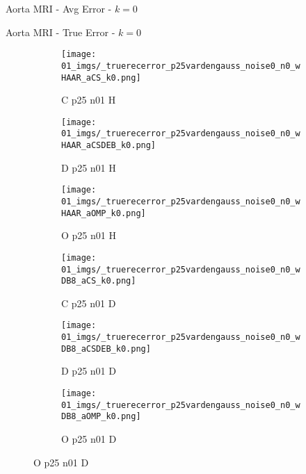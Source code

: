 \begin{frame}{Aorta MRI - Avg Error - $k=0$}{}
\begin{figure}
\end{figure}
\end{frame}


\begin{frame}{Aorta MRI - True Error - $k=0$}{}
\begin{figure}
\begin{subfigure}{0.13\textwidth}
\texttt{[image: 01\_imgs/\_truerecerror\_p25vardengauss\_noise0\_n0\_wHAAR\_aCS\_k0.png]}
\caption*{\tiny C p25 n01 H}
\end{subfigure}
\begin{subfigure}{0.13\textwidth}
\texttt{[image: 01\_imgs/\_truerecerror\_p25vardengauss\_noise0\_n0\_wHAAR\_aCSDEB\_k0.png]}
\caption*{\tiny D p25 n01 H}
\end{subfigure}
\begin{subfigure}{0.13\textwidth}
\texttt{[image: 01\_imgs/\_truerecerror\_p25vardengauss\_noise0\_n0\_wHAAR\_aOMP\_k0.png]}
\caption*{\tiny O p25 n01 H}
\end{subfigure}
\begin{subfigure}{0.13\textwidth}
\texttt{[image: 01\_imgs/\_truerecerror\_p25vardengauss\_noise0\_n0\_wDB8\_aCS\_k0.png]}
\caption*{\tiny C p25 n01 D}
\end{subfigure}
\begin{subfigure}{0.13\textwidth}
\texttt{[image: 01\_imgs/\_truerecerror\_p25vardengauss\_noise0\_n0\_wDB8\_aCSDEB\_k0.png]}
\caption*{\tiny D p25 n01 D}
\end{subfigure}
\begin{subfigure}{0.13\textwidth}
\texttt{[image: 01\_imgs/\_truerecerror\_p25vardengauss\_noise0\_n0\_wDB8\_aOMP\_k0.png]}
\caption*{\tiny O p25 n01 D}
\end{subfigure}

\vspace{5pt}


\end{figure}
\end{frame}

